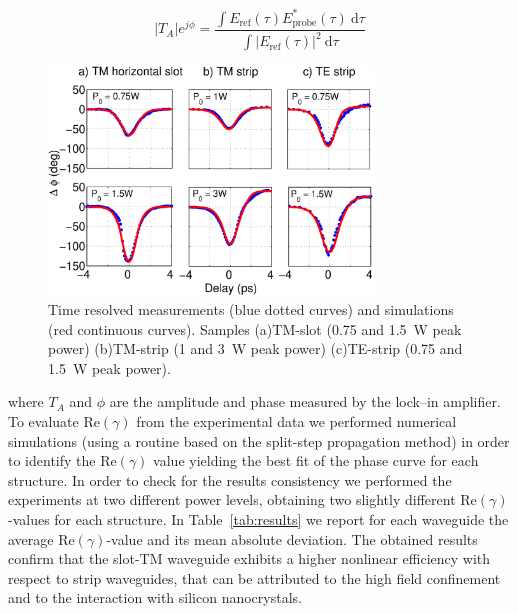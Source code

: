 \documentclass[10pt,letterpaper]{article}
\begin{document}
                                                                \begin{equation}
                                                                        |T_{A}|e^{j\phi} =
                                                                        \frac{\int E_{\mathrm{ref}}(\tau) E^*_{\mathrm{probe}}(\tau) ~ \mathrm{d}\tau}
                                                                        {\int |E_{\mathrm{ref}}(\tau)|^2~\mathrm{d}\tau}
                                                                \end{equation}


                                                                
\begin{figure}[htb]
  \centering
  \includegraphics[width=0.77\textwidth]{measurements_v9}
  \caption{Time resolved measurements (blue dotted curves) and simulations (red continuous curves). Samples (a)TM-slot (0.75 and 1.5~W peak power) (b)TM-strip (1 and 3~W peak power) (c)TE-strip (0.75 and 1.5~W peak power).}
  \label{fig:timeResolvesMeasurements}
\end{figure}

where $T_A$ and $\phi$ are the amplitude and phase measured by the lock--in amplifier.
To evaluate Re$(\gamma)$ from the experimental data we performed numerical simulations (using a routine based on the split-step propagation method) in order to identify the Re$(\gamma)$ value yielding the best fit of the phase curve for each structure. In order to check for the results consistency we performed the experiments at two different power levels, obtaining two slightly different Re$(\gamma)$-values for each structure. In Table~\ref{tab:results} we report for each waveguide the average Re$(\gamma)$-value and its mean absolute deviation. 
The obtained results confirm that the slot-TM waveguide exhibits a higher nonlinear efficiency with respect to strip waveguides, that can be attributed to the high field confinement and to the interaction with silicon nanocrystals.
\end{document}
